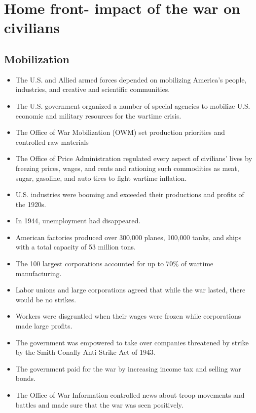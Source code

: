 \documentclass[12pt]{article} %
\begin{document}
	\section{Home front- impact of the war on civilians}

	\subsection{Mobilization}
	\begin{itemize}
		\item The U.S. and Allied armed forces depended on mobilizing America's people, industries, and 
			creative and scientific communities.
		\item The U.S. government organized a number of special agencies to mobilize U.S. economic and 
			military resources for the wartime crisis. 
		\item The Office of War Mobilization (OWM) set production priorities and controlled raw materials
		\item The Office of Price Administration regulated every aspect of civilians' lives by freezing
			prices, wages, and rents and rationing such commodities as meat, sugar, gasoline, and auto tires
			to fight wartime inflation.
		\item U.S. industries were booming and exceeded their productions and profits of the 1920s.
		\item In 1944, unemployment had disappeared.
		\item American factories produced over 300,000 planes, 100,000 tanks, and ships with a total 
			capacity of 53 million tons.
		\item The 100 largest corporations accounted for up to 70\% of wartime manufacturing.
		\item Labor unions and large corporations agreed that while the war lasted, there would be no 
			strikes. 
		\item Workers were disgruntled when their wages were frozen while corporations made large profits.
		\item The government was empowered to take over companies threatened by strike by the Smith Conally 
			Anti-Strike Act of 1943.
		\item The government paid for the war by increasing income tax and selling war bonds.
		\item The Office of War Information controlled news about troop movements and battles and made sure 
			that the war was seen positively.
	\end{itemize}
\end{document}
